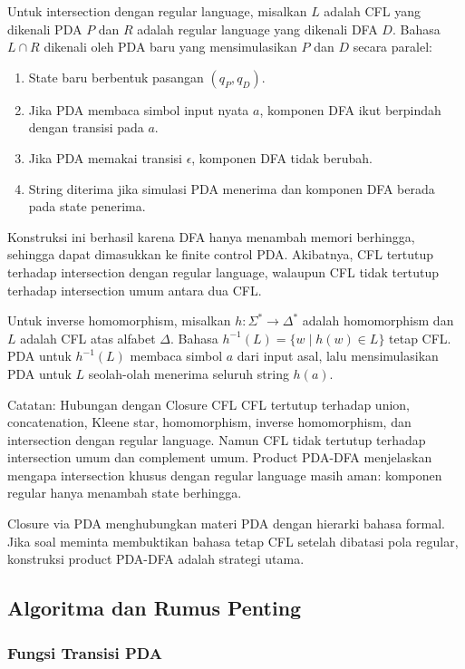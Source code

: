 Untuk intersection dengan regular language, misalkan $L$ adalah CFL yang dikenali PDA $P$ dan $R$ adalah regular language yang dikenali DFA $D$. Bahasa $L\cap R$ dikenali oleh PDA baru yang mensimulasikan $P$ dan $D$ secara paralel:
\begin{enumerate}
    \item State baru berbentuk pasangan $(q_P,q_D)$.
    \item Jika PDA membaca simbol input nyata $a$, komponen DFA ikut berpindah dengan transisi pada $a$.
    \item Jika PDA memakai transisi $\epsilon$, komponen DFA tidak berubah.
    \item String diterima jika simulasi PDA menerima dan komponen DFA berada pada state penerima.
\end{enumerate}

Konstruksi ini berhasil karena DFA hanya menambah memori berhingga, sehingga dapat dimasukkan ke finite control PDA. Akibatnya, CFL tertutup terhadap intersection dengan regular language, walaupun CFL tidak tertutup terhadap intersection umum antara dua CFL.

Untuk inverse homomorphism, misalkan $h:\Sigma^*\rightarrow\Delta^*$ adalah homomorphism dan $L$ adalah CFL atas alfabet $\Delta$. Bahasa $h^{-1}(L)=\{w\mid h(w)\in L\}$ tetap CFL. PDA untuk $h^{-1}(L)$ membaca simbol $a$ dari input asal, lalu mensimulasikan PDA untuk $L$ seolah-olah menerima seluruh string $h(a)$.

\begin{cmt}{Catatan: Hubungan dengan Closure CFL}{}
CFL tertutup terhadap union, concatenation, Kleene star, homomorphism, inverse homomorphism, dan intersection dengan regular language. Namun CFL tidak tertutup terhadap intersection umum dan complement umum. Product PDA-DFA menjelaskan mengapa intersection khusus dengan regular language masih aman: komponen regular hanya menambah state berhingga.
\end{cmt}

Closure via PDA menghubungkan materi PDA dengan hierarki bahasa formal. Jika soal meminta membuktikan bahasa tetap CFL setelah dibatasi pola regular, konstruksi product PDA-DFA adalah strategi utama.

\subsection{Algoritma dan Rumus Penting}

\subsubsection{Fungsi Transisi PDA}

